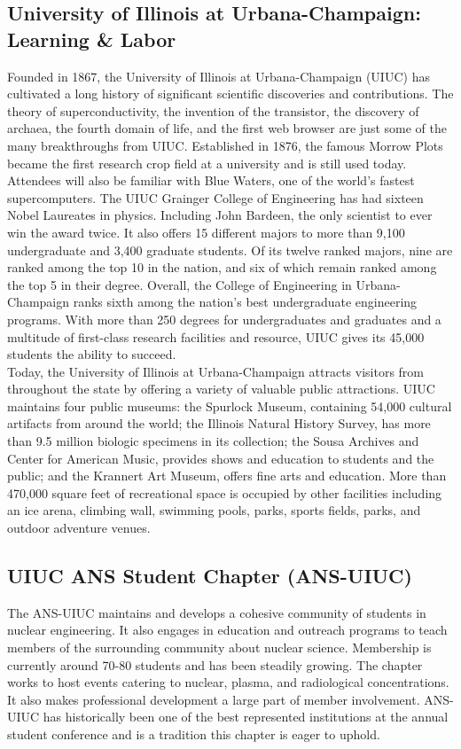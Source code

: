 \subsection{University of Illinois at Urbana-Champaign: Learning \& Labor}
Founded in 1867, the University of Illinois at Urbana-Champaign (UIUC) has cultivated a long history of significant scientific discoveries and contributions. The theory of superconductivity, the invention of the transistor, the discovery of archaea, the fourth domain of life, and the first web browser are just some of the many breakthroughs from UIUC. Established in 1876, the famous Morrow Plots became the first research crop field at a university and is still used today. Attendees will also be familiar with Blue Waters, one of the world’s fastest supercomputers. 
The UIUC Grainger College of Engineering has had sixteen Nobel Laureates in physics. Including John Bardeen, the only scientist to ever win the award twice. It also offers 15 different majors to more than 9,100 undergraduate and 3,400 graduate students. Of its twelve ranked majors, nine are ranked among the top 10 in the nation, and six of which remain ranked among the top 5 in their degree. Overall, the College of Engineering in Urbana-Champaign ranks sixth among the nation’s best undergraduate engineering programs. With more than 250 degrees for undergraduates and graduates and a multitude of first-class research facilities and resource, UIUC gives its 45,000 students the ability to succeed.\\
Today, the University of Illinois at Urbana-Champaign attracts visitors from throughout the state by offering a variety of valuable public attractions. UIUC maintains four public museums: the Spurlock Museum, containing 54,000 cultural artifacts from around the world; the Illinois Natural History Survey, has more than 9.5 million biologic specimens in its collection; the Sousa Archives and Center for American Music, provides shows and education to students and the public; and the Krannert Art Museum, offers fine arts and education. More than 470,000 square feet of recreational space is occupied by other facilities including an ice arena, climbing wall, swimming pools, parks, sports fields, parks, and outdoor adventure venues. 

\subsection{UIUC ANS Student Chapter (ANS-UIUC)}
The ANS-UIUC maintains and develops a cohesive community of students in nuclear engineering. It also engages in education and outreach programs to teach members of the surrounding community about nuclear science. Membership is currently around 70-80 students and has been steadily growing. The chapter works to host events catering to nuclear, plasma, and radiological concentrations. It also makes professional development a large part of member involvement. ANS-UIUC has historically been one of the best represented institutions at the annual student conference and is a tradition this chapter is eager to uphold. 

